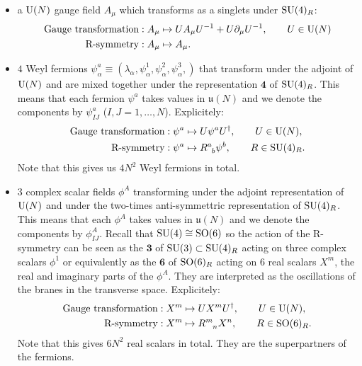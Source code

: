 \documentclass[a4paper,10pt]{article}
\begin{document}
        \begin{itemize}
            \item a $\text{U}(N)$ gauge field $A_\mu$ which transforms as a singlets under $\text{SU}(4)_R$:
            \begin{align}
                \text{Gauge transformation} &: A_\mu\mapsto UA_\mu U^{-1}+U\partial_\mu U^{-1},\qquad U\in\text{U}(N)\label{eq:transfA1}\\
                \text{R-symmetry} &: A_\mu\mapsto A_\mu.\label{eq:transfA2}
            \end{align}
            \item $4$ Weyl fermions $\psi^{a}_\alpha\equiv(\lambda_\alpha,\psi^1_\alpha,\psi^2_\alpha,\psi^3_\alpha,)$ that transform under the adjoint of $\text{U}(N)$ and are mixed together under the representation $\boldsymbol{4}$ of $\text{SU}(4)_R$. This means that each fermion $\psi^a$ takes values in $\mathfrak{u}(N)$ and we denote the components by $\psi^a_{IJ}$ ($I,J=1,\dots,N$). Explicitely:
            \begin{align}
                \text{Gauge transformation} &: \psi^a \mapsto U \psi^a U^\dagger ,\qquad U\in\U(N),\label{eq:transfpsi1}\\
                \text{R-symmetry} &: \psi^a\mapsto R\indices{^a_b}\psi^b,\qquad R\in\SU(4)_R.\label{eq:transfpsi2}
            \end{align}
            Note that this gives us $4N^2$ Weyl fermions in total.
            \item $3$ complex scalar fields $\phi^A$ transforming under the adjoint representation of $\text{U}(N)$ and under the two-times anti-symmettric representation of $\text{SU}(4)_R$. This means that each $\phi^A$ takes values in $\mathfrak{u}(N)$ and we denote the components by $\phi^A_{IJ}$. Recall that $\text{SU}(4)\cong\text{SO}(6)$ so the action of the R-symmetry can be seen as the $\boldsymbol{3}$ of $\text{SU}(3)\subset\text{SU}(4)_R$ acting on three complex scalars $\phi^1$ or equivalently as the $\boldsymbol{6}$ of $\text{SO}(6)_R$ acting on $6$ real scalars $X^m$, the real and imaginary parts of the $\phi^A$. They are interpreted as the oscillations of the branes in the transverse space. Explicitely:
            \begin{align}
                \text{Gauge transformation} &: X^m \mapsto U X^m U^\dagger ,\qquad U\in\U(N),\label{eq:transfphi1}\\
                \text{R-symmetry} &: X^m \mapsto R\indices{^m_n}X^n,\qquad R\in\SO(6)_R.\label{eq:transfphi2}
            \end{align}
            Note that this gives $6N^2$ real scalars in total. They are the superpartners of the fermions\marker.
        \end{itemize}
\end{document}

